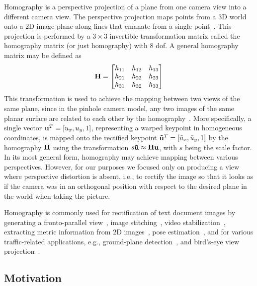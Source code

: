 Homography is a perspective projection of a plane from one camera view into a different camera view. The perspective projection maps points from a $3$D world onto a $2$D image plane along lines that emanate from a single point~\cite{geetha2013automatic, bousaid2020perspective}. This projection is performed by a $3 \times 3$ invertible transformation matrix called the homography matrix (or just homography) with $8$ \gls{dof}. A general homography matrix may be defined as
\begin{equation}
    \label{eq:HomographyMatrix}
    \mathbf{H} =
    \begin{bmatrix}
        h_{11} & h_{12} & h_{13}\\
        h_{21} & h_{22} & h_{23}\\
        h_{31} & h_{32} & h_{33}
    \end{bmatrix}
\end{equation}
This transformation is used to achieve the mapping between two views of the same plane, since in the pinhole camera model, any two images of the same planar surface are related to each other by the homography~\cite{hartley2003multiple, hartley1997defense}. More specifically, a single vector ${\mathbf{u}}^T = \left[ {u_x, u_y, 1} \right]$, representing a warped keypoint in homogeneous coordinates, is mapped onto the rectified keypoint  ${\mathbf{\tilde{u}}}^T = \left[ {\tilde{u}_x, \tilde{u}_y, 1} \right]$ by the homography $\mathbf{H}$ using the transformation $s \mathbf{\tilde{u}} \approx \mathbf{H} \mathbf{u}$, with $s$ being the scale factor. In its most general form, homography may achieve mapping between various perspectives. However, for our purposes we focused only on producing a view where perspective distortion is absent, i.e., to rectify the image so that it looks as if the camera was in an orthogonal position with respect to the desired plane in the world when taking the picture.

Homography is commonly used for rectification of text document images by generating a fronto-parallel view~\cite{lu2005perspective, miao2006perspective}, image stitching~\cite{adel2014image, gao2011constructing}, video stabilization~\cite{liu2015smooth}, extracting metric information from $2$D images~\cite{zhang2000flexible}, pose estimation~\cite{circularmarkerposeestim}, and for various traffic-related applications, e.g., ground-plane detection~\cite{arrospide2010homography}, and bird's-eye view projection~\cite{luo2010low}.

\subsection{Motivation}

